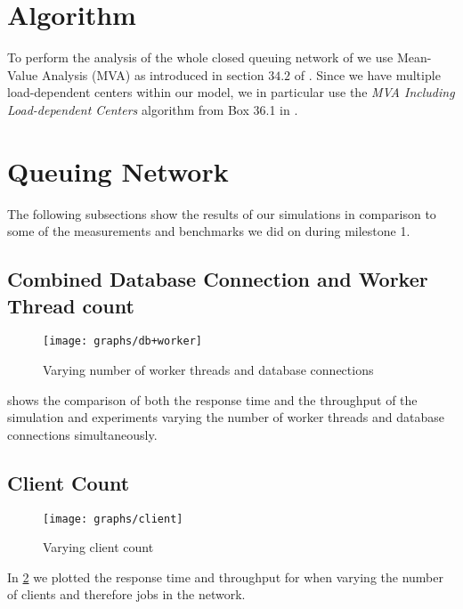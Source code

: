 \documentclass[a4paper, oneside]{csthesis}
\begin{document}
\section{Algorithm}
To perform the analysis of the whole closed queuing network of \telesto{} we use
Mean-Value Analysis (MVA) as introduced in section $34.2$ of \cite{jain2008art}.
Since we have multiple load-dependent centers within our model, we in particular
use the {\it MVA Including Load-dependent Centers} algorithm from Box 36.1 in
\cite{jain2008art}.

\section{Queuing Network}

    The following subsections show the results of our simulations in comparison
    to some of the measurements and benchmarks we did on \telesto{} during
    milestone 1.

    \newpage

\subsection{Combined Database Connection and Worker Thread count}
   
    \begin{figure}[th]
        \centering
            \texttt{[image: graphs/db+worker]}
            \caption{Varying number of worker threads and database connections}
            \label{fig:db+worker}
    \end{figure}
    
     shows the comparison of both the response time and the
    throughput of the simulation and experiments varying the number of worker
    threads and database connections simultaneously.
    
    \newpage
    
\subsection{Client Count}


    \begin{figure}[th]
        \centering
            \texttt{[image: graphs/client]}
            \caption{Varying client count}
            \label{fig:clientCount}
    \end{figure}
    
    In \cref{fig:clientCount} we plotted the response time and throughput for
    \telesto{} when varying the number of clients and therefore jobs in the
    network.
    
\end{document}
